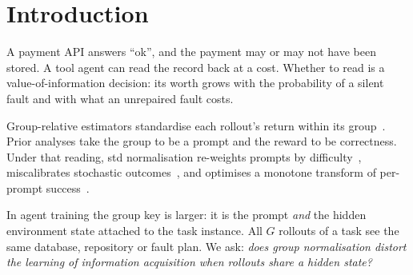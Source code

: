 \documentclass[11pt]{article}
\begin{document}
\section{Introduction}
A payment API answers ``ok'', and the payment may or may not have been stored. A tool agent can
read the record back at a cost. Whether to read is a value-of-information decision: its worth grows with the
probability of a silent fault and with what an unrepaired fault costs.

Group-relative estimators standardise each rollout's return within its group~\cite{liu2025drgrpo,bay2026identity}.
Prior analyses take the group to be a prompt and the reward to be correctness. Under that reading, std normalisation
re-weights prompts by difficulty~\cite{liu2025drgrpo}, miscalibrates stochastic outcomes~\cite{bereket2025uncalibrated},
and optimises a monotone transform of per-prompt success~\cite{davis2025objective}.

In agent training the group key is larger: it is the prompt \emph{and} the hidden environment state attached to the
task instance. All $G$ rollouts of a task see the same database, repository or fault plan. We ask:
\emph{does group normalisation distort the learning of information acquisition when rollouts share a hidden state?}
\end{document}
